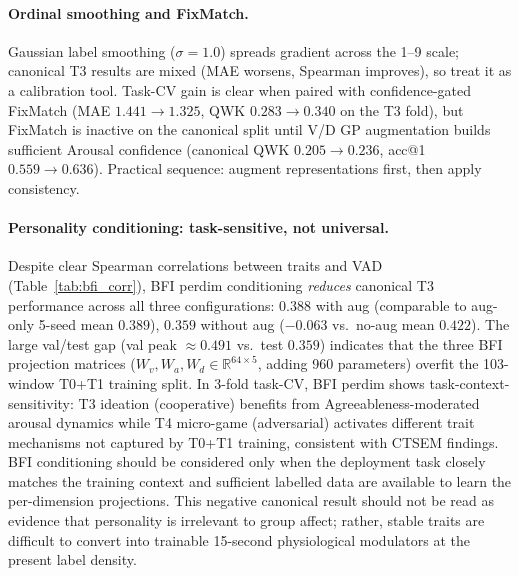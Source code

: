 \documentclass[sigconf,review,anonymous]{acmart}
\begin{document}
\paragraph{Ordinal smoothing and FixMatch.}
Gaussian label smoothing ($\sigma{=}1.0$) spreads gradient across the 1--9
scale; canonical T3 results are mixed (MAE worsens, Spearman improves),
so treat it as a calibration tool.
Task-CV gain is clear when paired with confidence-gated FixMatch
(MAE $1.441\to1.325$, QWK $0.283\to0.340$ on the T3 fold), but FixMatch
is inactive on the canonical split until V/D GP augmentation builds sufficient
Arousal confidence (canonical QWK $0.205\to0.236$, acc@1 $0.559\to0.636$).
Practical sequence: augment representations first, then apply consistency.

\paragraph{Personality conditioning: task-sensitive, not universal.}
Despite clear Spearman correlations between traits and VAD
(Table~\ref{tab:bfi_corr}), BFI perdim conditioning \emph{reduces}
canonical T3 performance across all three configurations:
$0.388$ with aug (comparable to aug-only 5-seed mean $0.389$), $0.359$
without aug ($-0.063$ vs.\ no-aug mean $0.422$).
The large val/test gap (val peak $\approx 0.491$ vs.\ test $0.359$)
indicates that the three BFI projection matrices
($W_v, W_a, W_d \in \mathbb{R}^{64 \times 5}$, adding 960 parameters)
overfit the 103-window T0+T1 training split.
In 3-fold task-CV, BFI perdim shows task-context-sensitivity:
T3 ideation (cooperative) benefits from Agreeableness-moderated arousal
dynamics while T4 micro-game (adversarial) activates different trait
mechanisms not captured by T0+T1 training, consistent with CTSEM findings.
BFI conditioning should be considered only when the deployment task closely
matches the training context and sufficient labelled data are available to
learn the per-dimension projections.
This negative canonical result should not be read as evidence that
personality is irrelevant to group affect; rather, stable traits are difficult
to convert into trainable 15-second physiological modulators at the present
label density.
\end{document}
